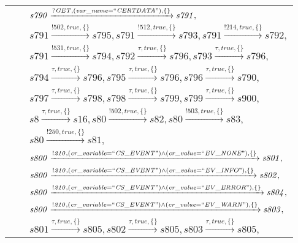 \begin{tabular}{lcl}
& & $\mathit{s790}\xrightarrow{\mathit{?GET}, \mathit{(var\_name = ``CERTDATA")}, \{\}}\mathit{s791},$ \\
& & $\mathit{s791}\xrightarrow{\mathit{!502}, \mathit{true}, \{\}}\mathit{s795},\mathit{s791}\xrightarrow{\mathit{!512}, \mathit{true}, \{\}}\mathit{s793},\mathit{s791}\xrightarrow{\mathit{!214}, \mathit{true}, \{\}}\mathit{s792},$ \\
& & $\mathit{s791}\xrightarrow{\mathit{!531}, \mathit{true}, \{\}}\mathit{s794},\mathit{s792}\xrightarrow{\mathit{\tau}, \mathit{true}, \{\}}\mathit{s796},\mathit{s793}\xrightarrow{\mathit{\tau}, \mathit{true}, \{\}}\mathit{s796},$ \\
& & $\mathit{s794}\xrightarrow{\mathit{\tau}, \mathit{true}, \{\}}\mathit{s796},\mathit{s795}\xrightarrow{\mathit{\tau}, \mathit{true}, \{\}}\mathit{s796},\mathit{s796}\xrightarrow{\mathit{\tau}, \mathit{true}, \{\}}\mathit{s790},$ \\
& & $\mathit{s797}\xrightarrow{\mathit{\tau}, \mathit{true}, \{\}}\mathit{s798},\mathit{s798}\xrightarrow{\mathit{\tau}, \mathit{true}, \{\}}\mathit{s799},\mathit{s799}\xrightarrow{\mathit{\tau}, \mathit{true}, \{\}}\mathit{s900},$ \\
& & $\mathit{s8}\xrightarrow{\mathit{\tau}, \mathit{true}, \{\}}\mathit{s16},\mathit{s80}\xrightarrow{\mathit{!502}, \mathit{true}, \{\}}\mathit{s82},\mathit{s80}\xrightarrow{\mathit{!503}, \mathit{true}, \{\}}\mathit{s83},$ \\
& & $\mathit{s80}\xrightarrow{\mathit{!250}, \mathit{true}, \{\}}\mathit{s81},$ \\
& & $\mathit{s800}\xrightarrow{\mathit{!210}, \mathit{(cr\_variable = ``CS\_EVENT") \land (cr\_value = ``EV\_NONE")}, \{\}}\mathit{s801},$ \\
& & $\mathit{s800}\xrightarrow{\mathit{!210}, \mathit{(cr\_variable = ``CS\_EVENT") \land (cr\_value = ``EV\_INFO")}, \{\}}\mathit{s802},$ \\
& & $\mathit{s800}\xrightarrow{\mathit{!210}, \mathit{(cr\_variable = ``CS\_EVENT") \land (cr\_value = ``EV\_ERROR")}, \{\}}\mathit{s804},$ \\
& & $\mathit{s800}\xrightarrow{\mathit{!210}, \mathit{(cr\_variable = ``CS\_EVENT") \land (cr\_value = ``EV\_WARN")}, \{\}}\mathit{s803},$ \\
& & $\mathit{s801}\xrightarrow{\mathit{\tau}, \mathit{true}, \{\}}\mathit{s805},\mathit{s802}\xrightarrow{\mathit{\tau}, \mathit{true}, \{\}}\mathit{s805},\mathit{s803}\xrightarrow{\mathit{\tau}, \mathit{true}, \{\}}\mathit{s805},$ \\

\end{tabular}
